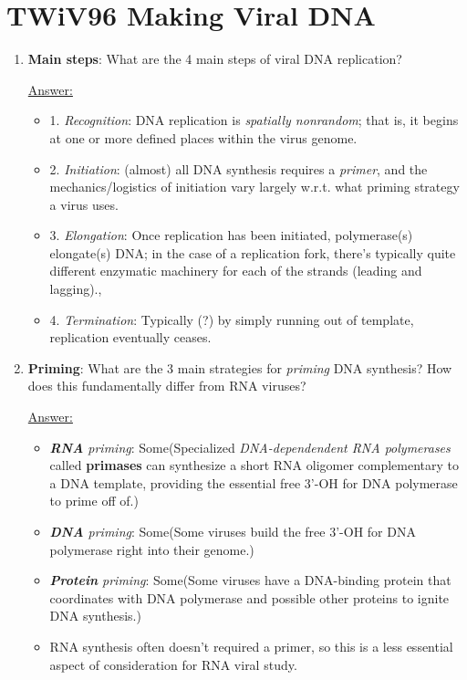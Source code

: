 \documentclass{article}
\newenvironment{QandA}{\begin{enumerate}[label=\bfseries Q\arabic*.]}
                       {\end{enumerate}}
\newenvironment{answered}{\par\normalfont\underline{Answer:}}{}
\begin{document}
\section{TWiV96 Making Viral DNA}
\begin{QandA}
  \item{\textbf{Main steps}: What are the 4 main steps of viral DNA replication?}
    \begin{answered}
    \begin{itemize}
      \item{1. \textit{Recognition}: DNA replication is \textit{spatially nonrandom}; that is, it begins at one or more defined places within the virus genome.}
      \item{2. \textit{Initiation}: (almost) all DNA synthesis requires a \textit{primer}, and the mechanics/logistics of initiation vary largely w.r.t. what priming strategy a virus uses.}
      \item{3. \textit{Elongation}: Once replication has been initiated, polymerase(s) elongate(s) DNA; in the case of a replication fork, there's typically quite different enzymatic machinery for each of the strands (leading and lagging)., }
      \item{4. \textit{Termination}: Typically (?) by simply running out of template, replication eventually ceases.}
    \end{itemize}
    \end{answered}
  \item{\textbf{Priming}: What are the 3 main strategies for \textit{priming} DNA synthesis? How does this fundamentally differ from RNA viruses?}
    \begin{answered}
    \begin{itemize}
      \item{\textit{\textbf{RNA} priming}: Some(Specialized \textit{DNA-dependendent RNA polymerases} called \textbf{primases} can synthesize a short RNA oligomer complementary to a DNA template, providing the essential free 3'-OH for DNA polymerase to prime off of.)}
      \item{\textit{\textbf{DNA} priming}: Some(Some viruses build the free 3'-OH for DNA polymerase right into their genome.)}
      \item{\textit{\textbf{Protein} priming}: Some(Some viruses have a DNA-binding protein that coordinates with DNA polymerase and possible other proteins to ignite DNA synthesis.)}
      \item{RNA synthesis often doesn't required a primer, so this is a less essential aspect of consideration for RNA viral study.}

\end{itemize}
\end{answered}
\end{QandA}
\end{document}
